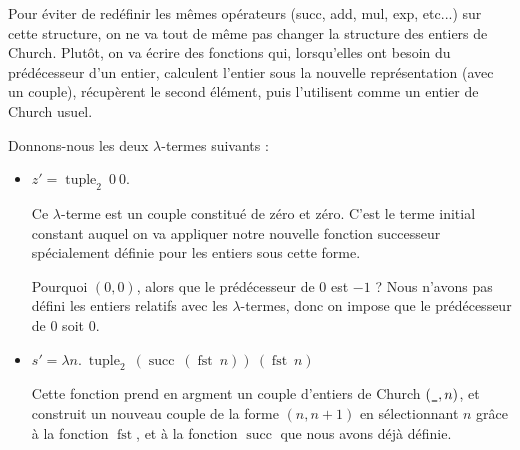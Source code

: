 \documentclass[11pt]{article}
\begin{document}
Pour éviter de redéfinir les mêmes opérateurs (succ, add, mul, exp, etc...) sur cette structure, on ne va tout de même pas changer la structure des entiers de Church. Plutôt, on va écrire des fonctions qui, lorsqu'elles ont besoin du prédécesseur d'un entier, calculent l'entier sous la nouvelle représentation (avec un couple), récupèrent le second élément, puis l'utilisent comme un entier de Church usuel.

Donnons-nous les deux $\lambda$-termes suivants :
\begin{itemize}
    \item $z' = \operatorname{tuple}_2~0~0$.
    
    Ce $\lambda$-terme est un couple constitué de zéro et zéro. C'est le terme initial constant auquel on va appliquer notre nouvelle fonction successeur spécialement définie pour les entiers sous cette forme.

    Pourquoi $(0, 0)$, alors que le prédécesseur de 0 est $-1$ ? Nous n'avons pas défini les entiers relatifs avec les $\lambda$-termes, donc on impose que le prédécesseur de 0 soit 0.
    \item $s' = \lambda n.~\operatorname{tuple}_2~\left(\operatorname{succ}~\left(\operatorname{fst}~n\right)\right)~\left(\operatorname{fst}~n\right)$
    
    Cette fonction prend en argment un couple d'entiers de Church $(\verb|_|, n)$, et construit un nouveau couple de la forme $(n, n + 1)$ en sélectionnant $n$ grâce à la fonction $\operatorname{fst}$, et à la fonction $\operatorname{succ}$ que nous avons déjà définie.
\end{itemize}
\end{document}
